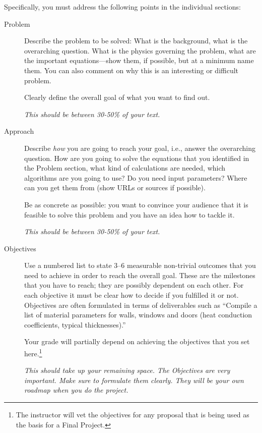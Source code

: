 \documentclass[letterpaper]{scrartcl}
\begin{document}
Specifically, you must address the following points in the individual
sections:
\begin{description}
\item[Problem] Describe the problem to be solved: What is the
  background, what is the overarching question. What is the physics
  governing the problem, what are the important equations---show them,
  if possible, but at a minimum name them. You can also comment
  on why this is an interesting or difficult problem. 

  Clearly define the overall goal of what you want to find out.

  \emph{This should be between 30-50\% of your text.}
\item[Approach] Describe \emph{how} you are going to reach your goal,
  i.e., answer the overarching question. How are you going to solve
  the equations that you identified in the Problem section, what kind
  of calculations are needed, which algorithms are you going to use?
  Do you need input parameters? Where can you get them from (show URLs
  or sources if possible).

  Be as concrete as possible: you want to convince your audience that
  it is feasible to solve this problem and you have an idea how to
  tackle it.

  \emph{This should be between 30-50\% of your text.}
  
\item[Objectives] Use a numbered list to state 3--6 measurable
  non-trivial outcomes that you need to achieve in order to reach the
  overall goal. These are the milestones that you have to reach; they
  are possibly dependent on each other. For each objective it must be
  clear how to decide if you fulfilled it or not. Objectives are often
  formulated in terms of deliverables such as ``Compile a list of
  material parameters for walls, windows and doors (heat conduction
  coefficients, typical thicknesses).''

  Your grade will partially depend on achieving the objectives that
  you set here.\footnote{The instructor will vet the objectives for any proposal
  that is being used as the basis for a Final Project.}

  \emph{This should take up your remaining space. The Objectives are
    very important. Make sure to formulate them clearly. They will be
    your own roadmap when you do the project.}  
\end{description}


\appendix
\end{document}
